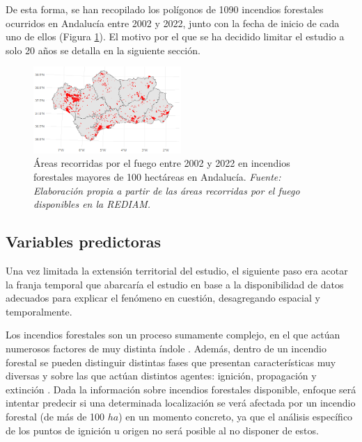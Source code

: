 \documentclass[12pt,a4paper,]{book}
\numberwithin{dummy}{section}
\theoremstyle{ocrenumbox}
\theoremstyle{blacknumex}
\theoremstyle{blacknumbox}
\theoremstyle{ocrenum}
\theoremstyle{ocrenum}
\begin{document}
De esta forma, se han recopilado los polígonos de 1090 incendios
forestales ocurridos en Andalucía entre 2002 y 2022, junto con la fecha
de inicio de cada uno de ellos (Figura \ref{fig:area_fuego}). El motivo
por el que se ha decidido limitar el estudio a solo 20 años se detalla
en la siguiente sección.

\begin{figure}[thb]
\centering
\includegraphics[width=0.5\textwidth]{graficos/areas_fuego.png}
\caption[Áreas recorridas por el fuego entre 2002 y 2022 en incendios mayores de 100 hectáreas en Andalucía]{Áreas recorridas por el fuego entre 2002 y 2022 en incendios forestales mayores de 100 hectáreas en Andalucía. \it Fuente: Elaboración propia a partir de las áreas recorridas por el fuego disponibles en la REDIAM.}
\label{fig:area_fuego}
\end{figure}

\hypertarget{variables-predictoras}{%
\subsection{Variables predictoras}\label{variables-predictoras}}

Una vez limitada la extensión territorial del estudio, el siguiente paso
era acotar la franja temporal que abarcaría el estudio en base a la
disponibilidad de datos adecuados para explicar el fenómeno en cuestión,
desagregando espacial y temporalmente.

Los incendios forestales son un proceso sumamente complejo, en el que
actúan numerosos factores de muy distinta índole
\citep{causalidadIncendios, incendioCamCLim}. Además, dentro de un
incendio forestal se pueden distinguir distintas fases que presentan
características muy diversas y sobre las que actúan distintos agentes:
ignición, propagación y extinción \citep{ReviewMLApplicationsWF}. Dada
la información sobre incendios forestales disponible, enfoque será
intentar predecir si una determinada localización se verá afectada por
un incendio forestal (de más de 100 \(ha\)) en un momento concreto, ya
que el análisis específico de los puntos de ignición u origen no será
posible al no disponer de estos.
\end{document}
